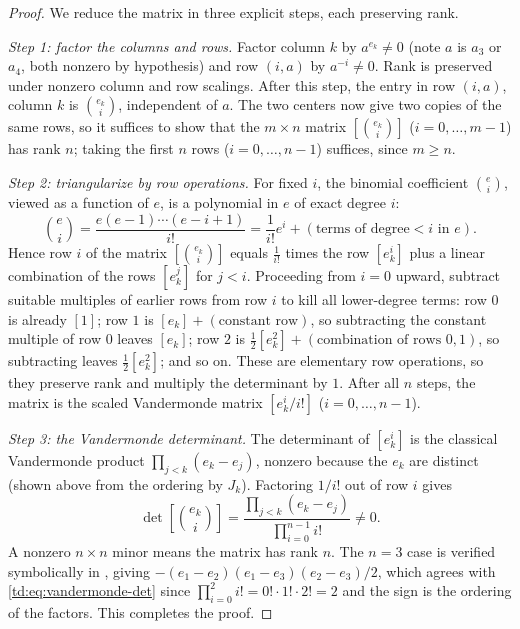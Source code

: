 \documentclass[a4paper,11pt]{article}
\newcommand{\filename}[1]{\texttt{\seqsplit{#1}}}
\theoremstyle{plain}
\theoremstyle{definition}
\theoremstyle{remark}
\begin{document}
\begin{proof}
We reduce the matrix in three explicit steps, each preserving rank.

\emph{Step 1: factor the columns and rows.} Factor column $k$ by $a^{e_k} \neq 0$ (note $a$
is $a_3$ or $a_4$, both nonzero by hypothesis) and row $(i, a)$ by $a^{-i} \neq 0$. Rank is
preserved under nonzero column and row scalings. After this step, the entry in row
$(i, a)$, column $k$ is $\binom{e_k}{i}$, independent of $a$. The two centers now give two
copies of the same rows, so it suffices to show that the $m \times n$ matrix
$[\binom{e_k}{i}]$ ($i = 0, \dots, m-1$) has rank $n$; taking the first $n$ rows
($i = 0, \dots, n-1$) suffices, since $m \geq n$.

\emph{Step 2: triangularize by row operations.} For fixed $i$, the binomial coefficient
$\binom{e}{i}$, viewed as a function of $e$, is a polynomial in $e$ of exact degree $i$:
\[
\binom{e}{i} = \frac{e (e-1) \cdots (e - i + 1)}{i!}
= \frac{1}{i!} e^i + (\text{terms of degree} < i \text{ in } e).
\]
Hence row $i$ of the matrix $[\binom{e_k}{i}]$ equals $\frac{1}{i!}$ times the row
$[e_k^i]$ plus a linear combination of the rows $[e_k^j]$ for $j < i$. Proceeding from
$i = 0$ upward, subtract suitable multiples of earlier rows from row $i$ to kill all
lower-degree terms: row $0$ is already $[1]$; row $1$ is $[e_k] + (\text{constant row})$,
so subtracting the constant multiple of row $0$ leaves $[e_k]$; row $2$ is
$\frac{1}{2}[e_k^2] + (\text{combination of rows } 0, 1)$, so subtracting leaves
$\frac{1}{2}[e_k^2]$; and so on. These are elementary row operations, so they preserve rank
and multiply the determinant by $1$. After all $n$ steps, the matrix is the scaled
Vandermonde matrix $[e_k^i / i!]$ ($i = 0, \dots, n-1$).

\emph{Step 3: the Vandermonde determinant.} The determinant of $[e_k^i]$ is the classical
Vandermonde product $\prod_{j < k} (e_k - e_j)$, nonzero because the $e_k$ are distinct
(shown above from the ordering by $J_k$). Factoring $1/i!$ out of row $i$ gives
\begin{equation}\label{td:eq:vandermonde-det}
\det[\binom{e_k}{i}] = \frac{\prod_{j<k}(e_k - e_j)}{\prod_{i=0}^{n-1} i!} \neq 0.
\end{equation}
A nonzero $n \times n$ minor means the matrix has rank $n$. The $n = 3$ case is verified
symbolically in \filename{m1\_block\_rank.py}, giving
$-(e_1-e_2)(e_1-e_3)(e_2-e_3)/2$, which agrees with \eqref{td:eq:vandermonde-det} since
$\prod_{i=0}^{2} i! = 0! \cdot 1! \cdot 2! = 2$ and the sign is the ordering of the factors.
This completes the proof.
\end{proof}
\end{document}
